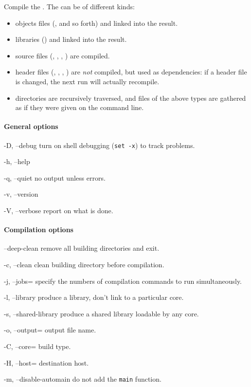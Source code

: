 Compile the .  The  can be of different kinds:
\begin{itemize}
\item objects files (,  and so forth) and linked
  into the result.
\item libraries () and linked into the result.
\item source files (, , , )
  are compiled.
\item header files (, , ,
  ) are \emph{not} compiled, but used as dependencies: if
  a header file is changed, the next  run will actually
  recompile.
\item directories are recursively traversed, and files of the above
  types are gathered as if they were given on the command line.
\end{itemize}

\paragraph{General options}
\begin{options}
\item[-D, --debug] turn on shell debugging (\lstinline|set -x|) to
  track  problems.
\item[-h, --help] \optionHelp
\item[-q, --quiet] no output unless errors.
\item[-v, --version] \optionVersion
\item[-V, --verbose] report on what is done.
\end{options}

\paragraph{Compilation options}
\begin{options}
\item[--deep-clean] remove all building directories and exit.
\item[-c, --clean] clean building directory before compilation.
\item[-j, --jobs=\var{jobs}] specify the numbers of compilation
  commands to run simultaneously.
\item[-l, --library] produce a library, don't link to a particular
  core.
\item[-s, --shared-library] produce a shared library loadable by any
  core.
\item[-o, --output=\var{output}] output file name.
\item[-C, --core=\var{core}] build type.
\item[-H, --host=\var{host}] destination host.
\item[-m, --disable-automain] do not add the \lstinline|main| function.
\end{options}

